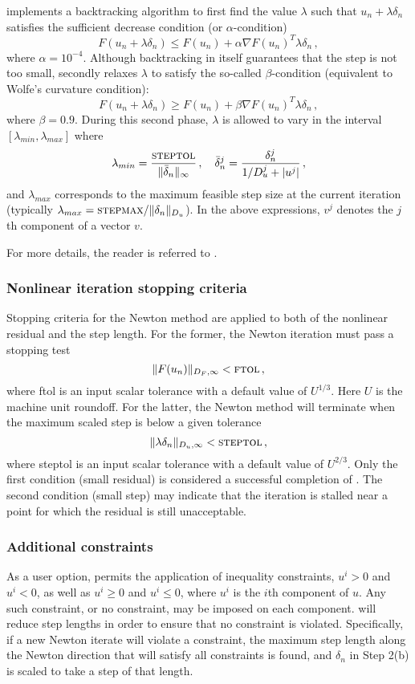{\kinsol} implements a backtracking algorithm to first find
the value $\lambda$ such that $u_n + \lambda \delta_n$
satisfies the sufficient decrease condition (or $\alpha$-condition)
\[
F(u_n + \lambda\delta_n) \le F(u_n) + \alpha \nabla F(u_n)^T \lambda\delta_n \, ,
\]
where $\alpha = 10^{-4}$.
Although backtracking in itself guarantees that the step is not too small,
{\kinsol} secondly relaxes $\lambda$ to satisfy the so-called $\beta$-condition
(equivalent to Wolfe's curvature condition):
\[
F(u_n + \lambda\delta_n) \ge F(u_n) + \beta \nabla F(u_n)^T \lambda\delta_n \, ,
\]
where $\beta = 0.9$. During this second phase, $\lambda$ is allowed to
vary in the interval $[\lambda_{min} , \lambda_{max}]$ where
\[
\lambda_{min} =  \frac{\mbox{\sc steptol}}{\| \bar\delta_n\|_{\infty}} \, , \quad
\bar\delta_n^j = \frac{\delta_n^j}{1/D_u^j + |u^j|} \, ,
\]
and $\lambda_{max}$ corresponds to the maximum feasible step size at the
current iteration (typically $\lambda_{max} = \mbox{\sc stepmax} / \|\delta_n\|_{D_u}$).
In the above expressions, $v^j$ denotes the $j$th component of a vector $v$.

For more details, the reader is referred to \cite{DeSc:96}.


\subsubsection*{Nonlinear iteration stopping criteria}
Stopping criteria for the Newton method are applied to
both of the nonlinear residual and the step length.  For the
former, the Newton iteration must pass a stopping test
\[ \|F(u_n)\|_{D_F,\infty} < \mbox{\sc ftol} \, , \]
where {\sc ftol} is an input scalar tolerance with a default value
of $U^{1/3}$.  Here $U$ is the machine unit roundoff.
For the latter, the Newton method will terminate
when the maximum scaled step is below a given tolerance
\[ \|\lambda\delta_n\|_{D_u,\infty} < \mbox{\sc steptol} \, , \]
where {\sc steptol} is an input scalar tolerance with a default
value of $U^{2/3}$.  Only the first condition (small residual)
is considered a successful completion of {\kinsol}.  The second
condition (small step) may indicate that the iteration is stalled
near a point for which the residual is still unacceptable.


\subsubsection*{Additional constraints}
As a user option, {\kinsol} permits the application of inequality
constraints, $u^i > 0$ and $u^i < 0$, as well as $u^i \geq 0$ and
$u^i \leq 0$, where $u^i$ is the $i$th component of $u$.  Any such
constraint, or no constraint, may be imposed on each component.
{\kinsol} will reduce step lengths in order to ensure that no
constraint is violated.  Specifically, if a new Newton iterate
will violate a constraint, the maximum step length along
the Newton direction that will satisfy all constraints is found,
and $\delta_n$ in Step 2(b) is scaled to take a step of that length.

